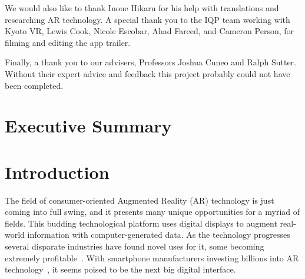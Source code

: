 \documentclass[a4paper, 10pt, american, titlepage]{article}
\begin{document}
We would also like to thank Inoue Hikaru for his help with translations and
researching AR technology. A special thank you to the IQP team working with
Kyoto VR, Lewis Cook, Nicole Escobar, Ahad Fareed, and Cameron Person, for
filming and editing the app trailer.

Finally, a thank you to our advisers, Professors Joshua Cuneo and Ralph Sutter.
Without their expert advice and feedback this project probably could not have
been completed.

\clearpage

\section*{Executive Summary}
\label{sec:executiveSummary}

\clearpage

\begin{singlespace}
	\tableofcontents
	\clearpage

	\listoffigures
	\clearpage

	\listoftables
	\clearpage
\end{singlespace}


\section{Introduction}
\label{sec:introduction}

The field of consumer-oriented Augmented Reality (AR) technology is just coming
into full swing, and it presents many unique opportunities for a myriad of
fields. This budding technological platform uses digital displays to augment
real-world information with computer-generated data. As the technology
progresses several disparate industries have found novel uses for it, some
becoming extremely profitable~\autocite{webster2018}. With smartphone
manufacturers investing billions into AR technology~\autocite{mason2016}, it
seems poised to be the next big digital interface.
\end{document}
